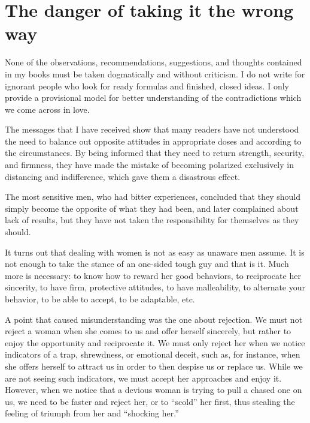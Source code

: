 \section{The danger of taking it the wrong way}

\par None of the observations, recommendations, suggestions, and thoughts contained in my books must be taken dogmatically and without criticism. I do not write for ignorant people who look for ready formulas and finished, closed ideas. I only provide a provisional model for better understanding of the contradictions which we come across in love.

\par The messages that I have received show that many readers have not understood the need to balance out opposite attitudes in appropriate doses and according to the circumstances. By being informed that they need to return strength, security, and firmness, they have made the mistake of becoming polarized exclusively in distancing and indifference, which gave them a disastrous effect.

\par The most sensitive men, who had bitter experiences, concluded that they should simply become the opposite of what they had been, and later complained about lack of results, but they have not taken the responsibility for themselves as they should.

\par It turns out that dealing with women is not as easy as unaware men assume. It is not enough to take the stance of an one-sided tough guy and that is it. Much more is necessary: to know how to reward her good behaviors, to reciprocate her sincerity, to have firm, protective attitudes, to have malleability, to alternate your behavior, to be able to accept, to be adaptable, etc.

\par A point that caused misunderstanding was the one about rejection. We must not reject a woman when she comes to us and offer herself sincerely, but rather to enjoy the opportunity and reciprocate it. We must only reject her when we notice indicators of a trap, shrewdness, or emotional deceit, such as, for instance, when she offers herself to attract us in order to then despise us or replace us. While we are not seeing such indicators, we must accept her approaches and enjoy it. However, when we notice that a devious woman is trying to pull a chased one on us, we need to be faster and reject her, or to \enquote{scold} her first, thus stealing the feeling of triumph from her and \enquote{shocking her.}

